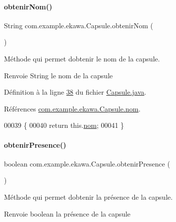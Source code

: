 \paragraph{\texorpdfstring{obtenir\+Nom()}{obtenirNom()}}
{\footnotesize\ttfamily String com.\+example.\+ekawa.\+Capsule.\+obtenir\+Nom (\begin{DoxyParamCaption}{ }\end{DoxyParamCaption})}



Méthode qui permet d\textquotesingle{}obtenir le nom de la capsule. 

\begin{DoxyReturn}{Renvoie}
String le nom de la capsule 
\end{DoxyReturn}


Définition à la ligne \hyperlink{_capsule_8java_source_l00038}{38} du fichier \hyperlink{_capsule_8java_source}{Capsule.\+java}.



Références \hyperlink{_capsule_8java_source_l00018}{com.\+example.\+ekawa.\+Capsule.\+nom}.


\begin{DoxyCode}
00039     \{
00040         \textcolor{keywordflow}{return} this.\hyperlink{classcom_1_1example_1_1ekawa_1_1_capsule_a936a082e9bcfdda4bb8fbffd33665cb0}{nom};
00041     \}
\end{DoxyCode}
\mbox{\label{classcom_1_1example_1_1ekawa_1_1_capsule_a66a878ce2dd20d39cf49d1d66cc5c600}} 
\paragraph{\texorpdfstring{obtenir\+Presence()}{obtenirPresence()}}
{\footnotesize\ttfamily boolean com.\+example.\+ekawa.\+Capsule.\+obtenir\+Presence (\begin{DoxyParamCaption}{ }\end{DoxyParamCaption})}



Méthode qui permet d\textquotesingle{}obtenir la présence de la capsule. 

\begin{DoxyReturn}{Renvoie}
boolean la présence de la capsule 
\end{DoxyReturn}


